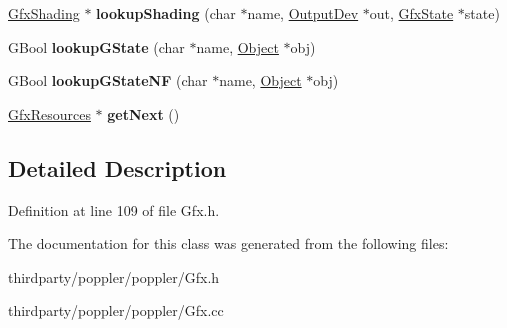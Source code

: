 \begin{DoxyCompactItemize}
\item 
\mbox{\label{class_gfx_resources_a28c96a5e326fc9ced60b31b281a87503}} 
\hyperlink{class_gfx_shading}{Gfx\+Shading} $\ast$ {\bfseries lookup\+Shading} (char $\ast$name, \hyperlink{class_output_dev}{Output\+Dev} $\ast$out, \hyperlink{class_gfx_state}{Gfx\+State} $\ast$state)
\item 
\mbox{\label{class_gfx_resources_a75a84e823080c04f4f9a11b9c31c3649}} 
G\+Bool {\bfseries lookup\+G\+State} (char $\ast$name, \hyperlink{class_object}{Object} $\ast$obj)
\item 
\mbox{\label{class_gfx_resources_a38e974483ded6a1d01bef5e21c77b24b}} 
G\+Bool {\bfseries lookup\+G\+State\+NF} (char $\ast$name, \hyperlink{class_object}{Object} $\ast$obj)
\item 
\mbox{\label{class_gfx_resources_af068f26872d05f6510cb5a7f0c813b2a}} 
\hyperlink{class_gfx_resources}{Gfx\+Resources} $\ast$ {\bfseries get\+Next} ()
\end{DoxyCompactItemize}


\subsection{Detailed Description}


Definition at line 109 of file Gfx.\+h.



The documentation for this class was generated from the following files\+:\begin{DoxyCompactItemize}
\item 
thirdparty/poppler/poppler/Gfx.\+h\item 
thirdparty/poppler/poppler/Gfx.\+cc\end{DoxyCompactItemize}
